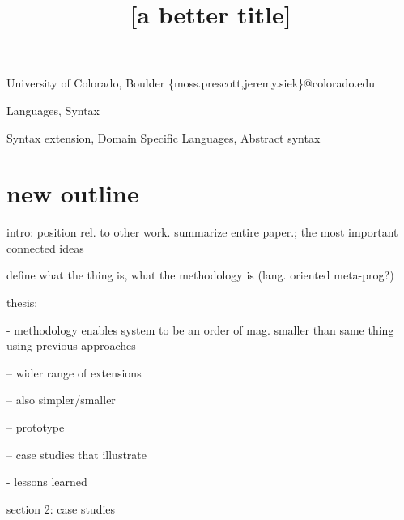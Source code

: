 \documentclass[preprint]{sigplanconf}
\begin{document}
\copyrightdata{[to be supplied]} 


\title{[a better title]}

           {University of Colorado, Boulder}
           {\{moss.prescott,jeremy.siek\}@colorado.edu}

\maketitle

\begin{abstract}
%
\end{abstract}


\terms
Languages, Syntax

\keywords
Syntax extension, Domain Specific Languages, Abstract syntax


\section{new outline}

intro: position rel. to other work. summarize entire paper.; the most important connected ideas

define what the thing is, what the methodology is (lang. oriented meta-prog?)

thesis:

- methodology enables system to be an order of mag. smaller than same thing using previous approaches

-- wider range of extensions

-- also simpler/smaller

-- prototype

-- case studies that illustrate


- lessons learned




section 2: case studies
\end{document}
